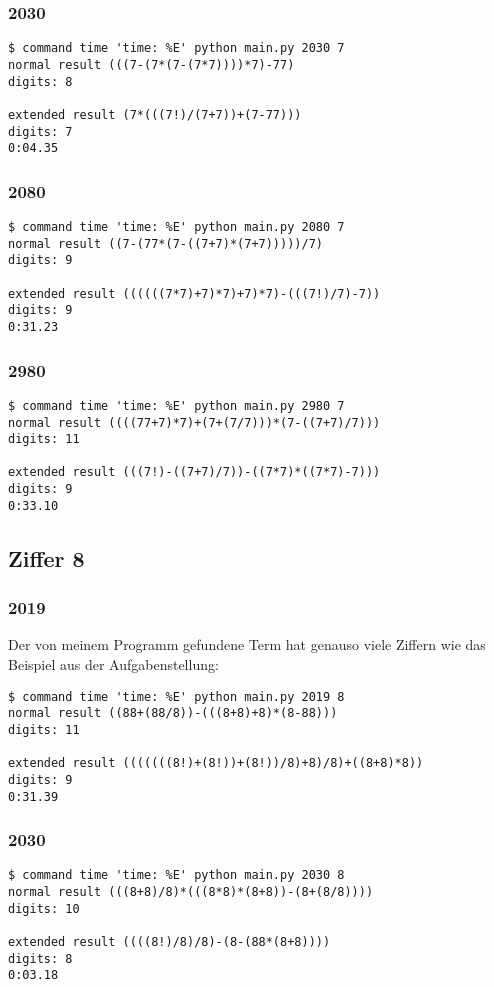 \subsubsection{2030}
\begin{lstlisting}
$ command time 'time: %E' python main.py 2030 7
normal result (((7-(7*(7-(7*7))))*7)-77)
digits: 8

extended result (7*(((7!)/(7+7))+(7-77)))
digits: 7
0:04.35
\end{lstlisting}
\subsubsection{2080}
\begin{lstlisting}
$ command time 'time: %E' python main.py 2080 7
normal result ((7-(77*(7-((7+7)*(7+7)))))/7)
digits: 9

extended result ((((((7*7)+7)*7)+7)*7)-(((7!)/7)-7))
digits: 9
0:31.23
\end{lstlisting}
\subsubsection{2980}
\begin{lstlisting}
$ command time 'time: %E' python main.py 2980 7
normal result ((((77+7)*7)+(7+(7/7)))*(7-((7+7)/7)))
digits: 11

extended result (((7!)-((7+7)/7))-((7*7)*((7*7)-7)))
digits: 9
0:33.10
\end{lstlisting}
\subsection{Ziffer 8}
\subsubsection{2019}
Der von meinem Programm gefundene Term hat genauso viele Ziffern wie das Beispiel aus der Aufgabenstellung:
\begin{lstlisting}
$ command time 'time: %E' python main.py 2019 8
normal result ((88+(88/8))-(((8+8)+8)*(8-88)))
digits: 11

extended result (((((((8!)+(8!))+(8!))/8)+8)/8)+((8+8)*8))
digits: 9
0:31.39
\end{lstlisting}
\subsubsection{2030}
\begin{lstlisting}
$ command time 'time: %E' python main.py 2030 8
normal result (((8+8)/8)*(((8*8)*(8+8))-(8+(8/8))))
digits: 10

extended result ((((8!)/8)/8)-(8-(88*(8+8))))
digits: 8
0:03.18
\end{lstlisting}
